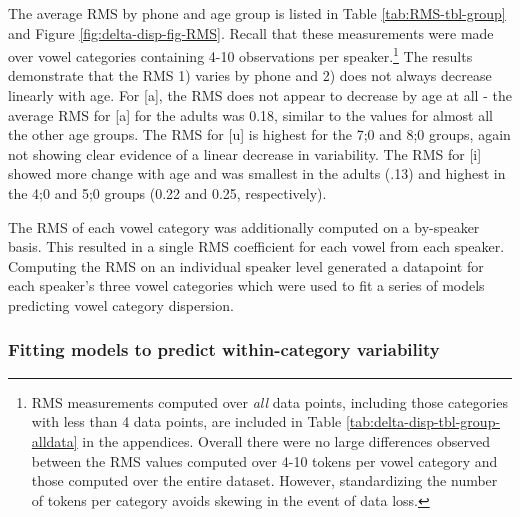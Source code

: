 \documentclass[
]{article}
\begin{document}
The average RMS by phone and age group is listed in Table \ref{tab:RMS-tbl-group} and Figure \ref{fig:delta-disp-fig-RMS}. Recall that these measurements were made over vowel categories containing 4-10 observations per speaker.\footnote{RMS measurements computed over \emph{all} data points, including those categories with less than 4 data points, are included in Table \ref{tab:delta-disp-tbl-group-alldata} in the appendices. Overall there were no large differences observed between the RMS values computed over 4-10 tokens per vowel category and those computed over the entire dataset. However, standardizing the number of tokens per category avoids skewing in the event of data loss.} The results demonstrate that the RMS 1) varies by phone and 2) does not always decrease linearly with age. For {[}a{]}, the RMS does not appear to decrease by age at all - the average RMS for {[}a{]} for the adults was 0.18, similar to the values for almost all the other age groups. The RMS for {[}u{]} is highest for the 7;0 and 8;0 groups, again not showing clear evidence of a linear decrease in variability. The RMS for {[}i{]} showed more change with age and was smallest in the adults (.13) and highest in the 4;0 and 5;0 groups (0.22 and 0.25, respectively).

The RMS of each vowel category was additionally computed on a by-speaker basis. This resulted in a single RMS coefficient for each vowel from each speaker. Computing the RMS on an individual speaker level generated a datapoint for each speaker's three vowel categories which were used to fit a series of models predicting vowel category dispersion.

\hypertarget{fitting-models-to-predict-within-category-variability}{%
\subsubsection{Fitting models to predict within-category variability}\label{fitting-models-to-predict-within-category-variability}}
\end{document}
